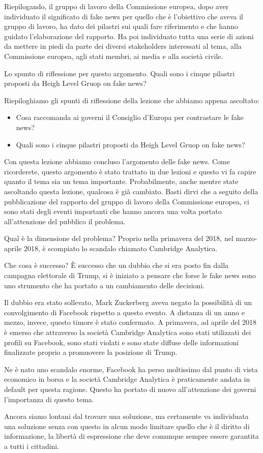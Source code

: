 Riepilogando, il gruppo di lavoro della Commissione europea, dopo aver individuato il significato di fake news per quello che è l'obiettivo che aveva il gruppo di lavoro, ha dato dei pilastri sui quali fare riferimento e che hanno guidato l'elaborazione del rapporto. Ha poi individuato tutta una serie di azioni da mettere in piedi da parte dei diversi stakeholders interessati al tema, alla Commissione europea, agli stati membri, ai media e alla società civile.\par 
Lo spunto di riflessione per questo argomento. Quali sono i cinque pilastri proposti da Heigh Level Gruop on fake news? \par
Riepiloghiamo gli spunti di riflessione della lezione che abbiamo appena ascoltato:

\begin{itemize}
    \item Cosa raccomanda ai governi il Consiglio d'Europa per contrastare le fake news?
    \item Quali sono i cinque pilastri proposti da Heigh Level Gruop on fake news?
\end{itemize}

Con questa lezione abbiamo concluso l'argomento delle fake news. 
Come ricorderete, questo argomento è stato trattato in due lezioni e questo vi fa capire quanto il tema sia un tema importante. Probabilmente, anche mentre state ascoltando questa lezione, qualcosa è già cambiato. Basti dirvi che a seguito della pubblicazione del rapporto del gruppo di lavoro della Commissione europea, ci sono stati degli eventi importanti che hanno ancora una volta portato all'attenzione del pubblico il problema.\par 

Qual è la dimensione del problema? Proprio nella primavera del 2018, nel marzo-aprile 2018, è scompiato lo scandalo chiamato Cambridge Analytica. \par
Che cosa è successo? È successo che un dubbio che si era posto fin dalla campagna elettorale di Trump, si è iniziato a pensare che forse le fake news sono uno strumento che ha portato a un cambiamento delle decisioni.\par
Il dubbio era stato sollevato, Mark Zuckerberg aveva negato la possibilità di un convolgimento di Facebook rispetto a questo evento. A distanza di un anno e mezzo, invece, questo timore è stato confermato. A primavera, ad aprile del 2018 è emerso che attraverso la società Cambridge Analytica sono stati utilizzati dei profili su Facebook, sono stati violati e sono state diffuse delle informazioni finalizzate proprio a promuovere la posizione di Trump.\par 
Ne è nato uno scandalo enorme, Facebook ha perso moltissimo dal punto di vista economico in borsa e la società Cambridge Analytica è praticamente andata in default per questa ragione. Questo ha portato di nuovo all'attenzione dei governi l'importanza di questo tema. \par
Ancora siamo lontani dal trovare una soluzione, ma certamente va individuata una soluzione senza con questo in alcun modo limitare quello che è il diritto di informazione, la libertà di espressione che deve comunque sempre essere garantita a tutti i cittadini. 